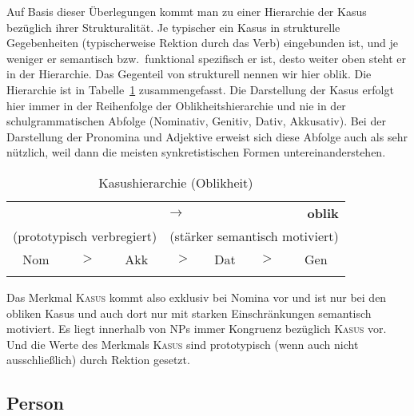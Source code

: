 \begin{exe}
\end{exe}


Auf Basis dieser Überlegungen kommt man zu einer Hierarchie der Kasus bezüglich ihrer Strukturalität.
Je typischer ein Kasus in strukturelle Gegebenheiten (typischerweise Rektion durch das Verb) eingebunden ist, und je weniger er semantisch bzw.\ funktional spezifisch er ist, desto weiter oben steht er in der Hierarchie.
Das Gegenteil von strukturell nennen wir hier oblik.
Die Hierarchie ist in Tabelle~\ref{tab:kashier} zusammengefasst.
Die Darstellung der Kasus erfolgt hier immer in der Reihenfolge der Oblikheitshierarchie und nie in der schulgrammatischen Abfolge (Nominativ, Genitiv, Dativ, Akkusativ).
Bei der Darstellung der Pronomina und Adjektive erweist sich diese Abfolge auch als sehr nützlich, weil dann die meisten synkretistischen Formen untereinanderstehen.

\begin{table}[!h]
  \centering
  \begin{tabular}{ccccccc}
   \lsptoprule
   \multicolumn{1}{l}{\textbf{strukturell}} & \multicolumn{5}{c}{$\longrightarrow$} & \multicolumn{1}{r}{\textbf{oblik}} \\
   \multicolumn{3}{l}{(prototypisch verbregiert)} & \multicolumn{4}{r}{(stärker semantisch motiviert)} \\
   \midrule
   Nom & $>$ & Akk & $>$ & Dat & $>$ & Gen \\
   \lspbottomrule
  \end{tabular}
  \caption{Kasushierarchie (Oblikheit)}
  \label{tab:kashier}
\end{table}

Das Merkmal \textsc{Kasus} kommt also exklusiv bei Nomina vor und ist nur bei den obliken Kasus und auch dort nur mit starken Einschränkungen semantisch motiviert.
Es liegt innerhalb von NPs immer Kongruenz bezüglich \textsc{Kasus} vor.
Und die Werte des Merkmals \textsc{Kasus} sind prototypisch (wenn auch nicht ausschließlich) durch Rektion gesetzt.

\subsection{Person}

\label{sec:person}


